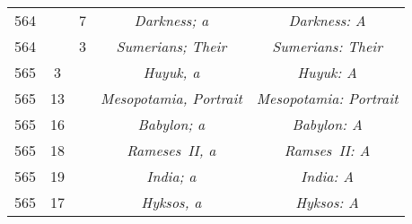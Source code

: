\documentclass[a4paper,11pt]{article}
\begin{document}
\begin{center}
\begin{tabular}{|c|c|c|c|c|}
    564 & &  7 & \textit{Darkness; a} & \textit{Darkness: A} \\
    564 & &  3 & \textit{Sumerians; Their} & \textit{Sumerians: Their} \\
    565 &  3 & & \textit{Huyuk, a} & \textit{Huyuk: A} \\
    565 & 13 & & \textit{Mesopotamia, Portrait}
           & \textit{Mesopotamia: Portrait} \\
    565 & 16 & & \textit{Babylon; a} & \textit{Babylon: A} \\
    565 & 18 & & \textit{Rameses~II, a} & \textit{Ramses~II: A} \\
    565 & 19 & & \textit{India; a} & \textit{India: A} \\
    565 & 17 & & \textit{Hyksos, a} & \textit{Hyksos: A} \\
    \hline
  \end{tabular}





  \newpage


\end{center}
\end{document}
